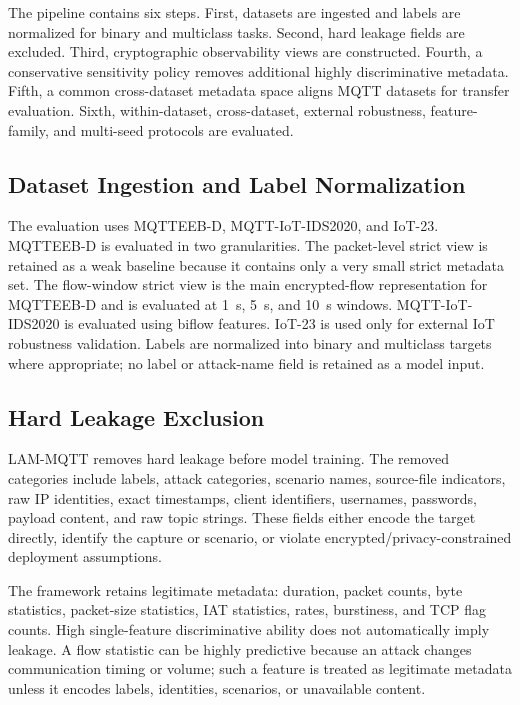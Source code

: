 \documentclass[lettersize,journal]{IEEEtran}
\begin{document}
The pipeline contains six steps. First, datasets are ingested and labels are normalized for binary and multiclass tasks. Second, hard leakage fields are excluded. Third, cryptographic observability views are constructed. Fourth, a conservative sensitivity policy removes additional highly discriminative metadata. Fifth, a common cross-dataset metadata space aligns MQTT datasets for transfer evaluation. Sixth, within-dataset, cross-dataset, external robustness, feature-family, and multi-seed protocols are evaluated.

\subsection{Dataset Ingestion and Label Normalization}
The evaluation uses MQTTEEB-D, MQTT-IoT-IDS2020, and IoT-23. MQTTEEB-D is evaluated in two granularities. The packet-level strict view is retained as a weak baseline because it contains only a very small strict metadata set. The flow-window strict view is the main encrypted-flow representation for MQTTEEB-D and is evaluated at 1~s, 5~s, and 10~s windows. MQTT-IoT-IDS2020 is evaluated using biflow features. IoT-23 is used only for external IoT robustness validation. Labels are normalized into binary and multiclass targets where appropriate; no label or attack-name field is retained as a model input.

\subsection{Hard Leakage Exclusion}
LAM-MQTT removes hard leakage before model training. The removed categories include labels, attack categories, scenario names, source-file indicators, raw IP identities, exact timestamps, client identifiers, usernames, passwords, payload content, and raw topic strings. These fields either encode the target directly, identify the capture or scenario, or violate encrypted/privacy-constrained deployment assumptions.

The framework retains legitimate metadata: duration, packet counts, byte statistics, packet-size statistics, IAT statistics, rates, burstiness, and TCP flag counts. High single-feature discriminative ability does not automatically imply leakage. A flow statistic can be highly predictive because an attack changes communication timing or volume; such a feature is treated as legitimate metadata unless it encodes labels, identities, scenarios, or unavailable content.
\end{document}
